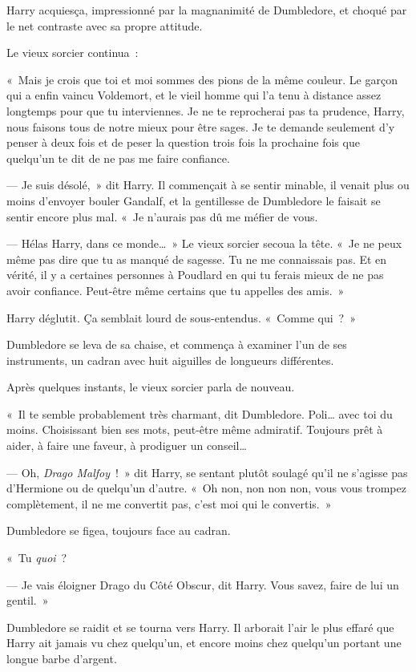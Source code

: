 Harry acquiesça, impressionné par la magnanimité de Dumbledore, et choqué par le net contraste avec sa propre attitude.

Le vieux sorcier continua~:

«~Mais je crois que toi et moi sommes des pions de la même couleur. Le garçon qui a enfin vaincu Voldemort, et le vieil homme qui l'a tenu à distance assez longtemps pour que tu interviennes. Je ne te reprocherai pas ta prudence, Harry, nous faisons tous de notre mieux pour être sages. Je te demande seulement d'y penser à deux fois et de peser la question trois fois la prochaine fois que quelqu'un te dit de ne pas me faire confiance.

--- Je suis désolé,~» dit Harry. Il commençait à se sentir minable, il venait plus ou moins d'envoyer bouler Gandalf, et la gentillesse de Dumbledore le faisait se sentir encore plus mal. «~Je n'aurais pas dû me méfier de vous.

--- Hélas Harry, dans ce monde…~» Le vieux sorcier secoua la tête. «~Je ne peux même pas dire que tu as manqué de sagesse. Tu ne me connaissais pas. Et en vérité, il y a certaines personnes à Poudlard en qui tu ferais mieux de ne pas avoir confiance. Peut-être même certains que tu appelles des amis.~»

Harry déglutit. Ça semblait lourd de sous-entendus. «~Comme qui~?~»

Dumbledore se leva de sa chaise, et commença à examiner l'un de ses instruments, un cadran avec huit aiguilles de longueurs différentes.

Après quelques instants, le vieux sorcier parla de nouveau.

«~Il te semble probablement très charmant, dit Dumbledore. Poli… avec toi du moins. Choisissant bien ses mots, peut-être même admiratif. Toujours prêt à aider, à faire une faveur, à prodiguer un conseil…

--- Oh, \emph{Drago Malfoy}~!~» dit Harry, se sentant plutôt soulagé qu'il ne s'agisse pas d'Hermione ou de quelqu'un d'autre. «~Oh non, non non non, vous vous trompez complètement, il ne me convertit pas, c'est moi qui le convertis.~»

Dumbledore se figea, toujours face au cadran.

«~Tu \emph{quoi}~?

--- Je vais éloigner Drago du Côté Obscur, dit Harry. Vous savez, faire de lui un gentil.~»

Dumbledore se raidit et se tourna vers Harry. Il arborait l'air le plus effaré que Harry ait jamais vu chez quelqu'un, et encore moins chez quelqu'un portant une longue barbe d'argent.

